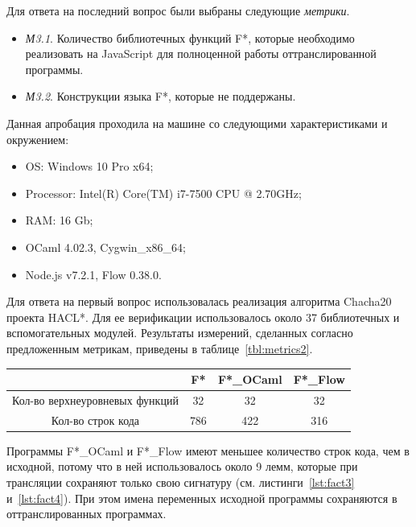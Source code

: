\documentclass[12pt]{matmex-diploma}
\begin{document}
Для ответа на последний вопрос были выбраны следующие \textit{метрики}.

\begin{itemize}
\item[] \textit{М3.1}. Количество библиотечных функций F*, которые необходимо реализовать на JavaScript для полноценной работы оттранслированной программы. 
\item[] \textit{М3.2}. Конструкции языка F*, которые не поддержаны.
\end{itemize}

Данная апробация проходила на машине со следующими характеристиками и окружением:

\begin{itemize}
\item OS: Windows 10 Pro x64;
\item Processor: Intel(R) Core(TM) i7-7500 CPU @ 2.70GHz;
\item RAM: 16 Gb;
\item OCaml 4.02.3, Cygwin\_x86\_64;
\item Node.js v7.2.1, Flow 0.38.0.
\end{itemize}

Для ответа на первый вопрос использовалась реализация алгоритма Chacha20~\cite{chacha} проекта HACL*. Для ее верификации использовалось около 37 библиотечных и вспомогательных модулей. Результаты измерений, сделанных согласно предложенным метрикам, приведены в таблице~\ref{tbl:metrics2}. 

\begin{center}  
\begin{tabular}{ | c | c | c | c | }
    \hline
      & F* & F*\_OCaml & F*\_Flow \\ \hline
    Кол-во верхнеуровневых функций & 32 & 32 & 32 \\ \hline
    Кол-во строк кода & 786 & 422 & 316 \\
    \hline
\end{tabular}
\captionsetup{type=table}
\label{tbl:metrics2} 
\end{center}

Программы F*\_OCaml и F*\_Flow  имеют меньшее количество строк кода, чем в исходной, потому что в ней использовалось около 9 лемм, которые при трансляции сохраняют только свою сигнатуру (см. листинги~\ref{lst:fact3} и~\ref{lst:fact4}). При этом имена переменных исходной программы сохраняются в оттранслированных программах.
\end{document}
